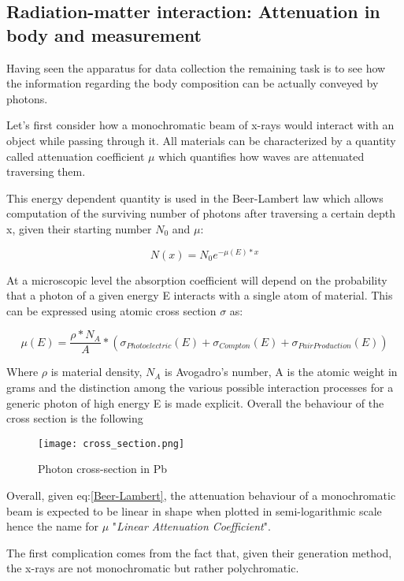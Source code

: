\subsection{Radiation-matter interaction: Attenuation in body and measurement}
Having seen the apparatus for data collection the remaining task is to see how the information regarding the body composition can be actually conveyed by photons.

Let's first consider how a monochromatic beam of x-rays would interact with an object while passing through it. All materials can be characterized by a quantity called attenuation coefficient $\mu$ which quantifies how waves are attenuated traversing them.

This energy dependent quantity is used in the Beer-Lambert law which allows computation of the surviving number of photons after traversing a certain depth x, given their starting number $N_0$ and $\mu$:

\begin{equation}
N(x) = N_0e^{-\mu(E)*x}
\label{Beer-Lambert}
\end{equation}

At a microscopic level the absorption coefficient will depend on the probability that a photon of a given energy E interacts with a single atom of material. This can be expressed using atomic cross section $\sigma$ as:

\begin{equation}\label{eq:Lin_att_coef_def}
\mu(E) = \frac{\rho*N_A}{A}*(\sigma_{Photoelectric}(E)+\sigma_{Compton}(E)+\sigma_{PairProduction}(E))
\end{equation}

Where $\rho$ is material density, $N_A$ is Avogadro's number, A is the atomic weight in grams and the distinction among the various possible interaction processes for a generic photon of high energy E is made explicit. Overall the behaviour of the cross section is the following

\begin{figure}[H]
\centering
  		\texttt{[image: cross\_section.png]}
        \caption{Photon cross-section in Pb\label{fig:Photon-Cross-sect}}
\end{figure}

Overall, given eq:\ref{Beer-Lambert}, the attenuation behaviour of a monochromatic beam is expected to be linear in shape when plotted in semi-logarithmic scale hence the name for $\mu$ "\textit{Linear Attenuation Coefficient}". 

The first complication comes from the fact that, given their generation method, the x-rays are not monochromatic but rather polychromatic.

